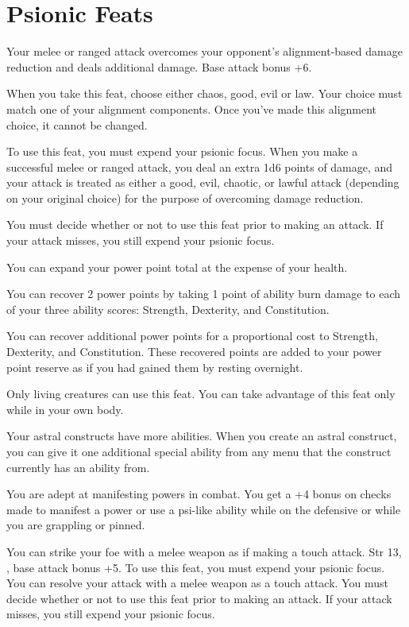 \section{Psionic Feats}

{Your melee or ranged attack overcomes your opponent's alignment-based damage reduction and deals additional damage.}
{Base attack bonus +6.}
{When you take this feat, choose either chaos, good, evil or law. Your choice must match one of your alignment components. Once you've made this alignment choice, it cannot be changed.

To use this feat, you must expend your psionic focus. When you make a successful melee or ranged attack, you deal an extra 1d6 points of damage, and your attack is treated as either a good, evil, chaotic, or lawful attack (depending on your original choice) for the purpose of overcoming damage reduction.

You must decide whether or not to use this feat prior to making an attack. If your attack misses, you still expend your psionic focus.}
{}{}

{You can expand your power point total at the expense of your health.}
{}
{You can recover 2 power points by taking 1 point of ability burn damage to each of your three ability scores: Strength, Dexterity, and Constitution.

You can recover additional power points for a proportional cost to Strength, Dexterity, and Constitution. These recovered points are added to your power point reserve as if you had gained them by resting overnight.}
{}
{Only living creatures can use this feat. You can take advantage of this feat only while in your own body.}

{Your astral constructs have more abilities.}
{}
{When you create an astral construct, you can give it one additional special ability from any menu that the construct currently has an ability from.}
{}{}

{You are adept at manifesting powers in combat.}
{}
{You get a +4 bonus on  checks made to manifest a power or use a psi-like ability while on the defensive or while you are grappling or pinned.}
{}{}

{You can strike your foe with a melee weapon as if making a touch attack.}
{Str 13, , base attack bonus +5.}
{To use this feat, you must expend your psionic focus. You can resolve your attack with a melee weapon as a touch attack. You must decide whether or not to use this feat prior to making an attack. If your attack misses, you still expend your psionic focus.}
{}{}

